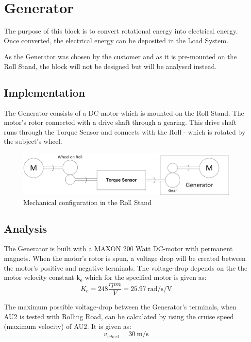 \newpage
\section{Generator}
The purpose of this block is to convert rotational energy into electrical energy. Once converted, the electrical energy can be deposited in the Load System.

As the Generator was chosen by the customer and as it is pre-mounted on the Roll Stand, the block will not be designed but will be analysed instead.

\subsection{Implementation}
The Generator consists of a DC-motor which is mounted on the Roll Stand. The motor's rotor connected with a drive shaft through a gearing. This drive shaft runs through the Torque Sensor and connects with the Roll - which is rotated by the subject's wheel.

\begin{figure}[H]
	\centering
	\includegraphics[width=1\linewidth]{Hardware/Pictures/Mechanical_Connections}
	\caption{Mechanical configuration in the Roll Stand}
	\label{fig:Generator_Implementation}
\end{figure}

\subsection{Analysis}
\label{sec:GeneratorAnalysis}
The Generator is built with a MAXON 200 Watt DC-motor with permanent magnets\cite{Maxon}. When the motor's rotor is spun, a voltage drop will be created between the motor's positive and negative terminals. The voltage-drop depends on the the motor velocity constant k\textsubscript{e} which for the specified motor is given as:
\begin{equation}
	K_e = 248 \frac{rpm}{V} = \SI[per-mode=fraction]{25.97}{\radian \per \second \per \volt}
\end{equation}

The maximum possible voltage-drop between the Generator's terminals, when AU2 is tested with Rolling Road, can be calculated by using the cruise speed (maximum velocity) of AU2\cite{BAC_zenith33}. It is given as:
\begin{equation}
	v_{wheel} = \SI[per-mode=fraction]{30}{\meter \per \second}
\end{equation}

